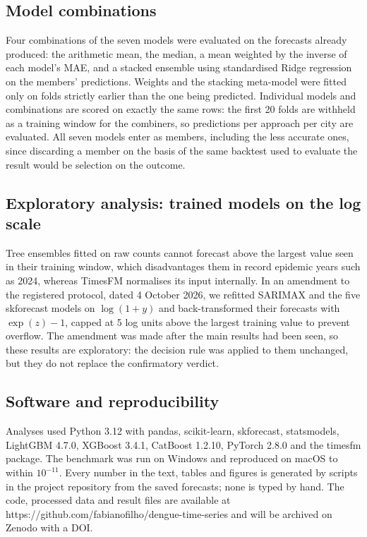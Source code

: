 \documentclass[10pt,letterpaper]{article}
\begin{document}
\subsection*{Model combinations}

Four combinations of the seven models were evaluated on the forecasts already produced: the arithmetic mean, the median, a mean weighted by the inverse of each model's MAE, and a stacked ensemble using standardised Ridge regression on the members' predictions. Weights and the stacking meta-model were fitted only on folds strictly earlier than the one being predicted. Individual models and combinations are scored on exactly the same rows: the first 20 folds are withheld as a training window for the combiners, so  predictions per approach per city are evaluated. All seven models enter as members, including the less accurate ones, since discarding a member on the basis of the same backtest used to evaluate the result would be selection on the outcome.

\subsection*{Exploratory analysis: trained models on the log scale}

Tree ensembles fitted on raw counts cannot forecast above the largest value seen in their training window, which disadvantages them in record epidemic years such as 2024, whereas TimesFM normalises its input internally. In an amendment to the registered protocol, dated 4 October 2026, we refitted SARIMAX and the five skforecast models on $\log(1 + y)$ and back-transformed their forecasts with $\exp(z) - 1$, capped at 5 log units above the largest training value to prevent overflow. The amendment was made after the main results had been seen, so these results are exploratory: the decision rule was applied to them unchanged, but they do not replace the confirmatory verdict.

\subsection*{Software and reproducibility}

Analyses used Python 3.12 with pandas, scikit-learn, skforecast, statsmodels, LightGBM 4.7.0, XGBoost 3.4.1, CatBoost 1.2.10, PyTorch 2.8.0 and the timesfm package. The benchmark was run on Windows and reproduced on macOS to within $10^{-11}$. Every number in the text, tables and figures is generated by scripts in the project repository from the saved forecasts; none is typed by hand. The code, processed data and result files are available at https://github.com/fabianofilho/dengue-time-series and will be archived on Zenodo with a DOI.
\end{document}

